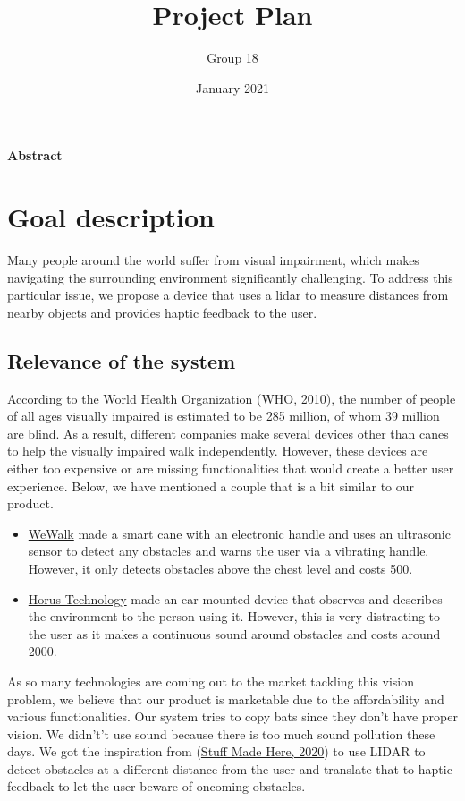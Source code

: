 \documentclass{article}
\title{Project Plan}
\author{Group 18}
\date{January 2021}
\begin{document}
\maketitle

\tableofcontents

\clearpage

\Large{\textbf{Abstract}}
\normalsize
\newline

\section{Goal description}
Many people around the world suffer from visual impairment, which makes navigating the surrounding environment significantly challenging. To address this particular issue, we propose a device that uses a lidar to measure distances from nearby objects and provides haptic feedback to the user.

\subsection{Relevance of the system}
According to the World Health Organization (\href{https://www.who.int/blindness/publications/globaldata/en/#:~:text=Globally\%20the\%20number\%20of\%20people,blindness\%20is\%20cataract\%20(51\%25).}{WHO, 2010}), the number of people of all ages visually impaired is estimated to be 285 million, of whom 39 million are blind. As a result, different companies make several devices other than canes to help the visually impaired walk independently. However, these devices are either too expensive or are missing functionalities that would create a better user experience. Below, we have mentioned a couple that is a bit similar to our product.
\begin{itemize}
\item \href{https://wewalk.io/en/}{WeWalk} made a smart cane with an electronic handle and uses an ultrasonic sensor to detect any obstacles and warns the user via a vibrating handle. However, it only detects obstacles above the chest level and costs 500.


\item \href{https://italianinnovationday.weebly.com/horus-technology.html}{Horus Technology} made an ear-mounted device that observes and describes the environment to the person using it. However, this is very distracting to the user as it makes a continuous sound around obstacles and costs around 2000.
\end{itemize}
As so many technologies are coming out to the market tackling this vision problem, we believe that our product is marketable due to the affordability and various functionalities.
\newline
Our system tries to copy bats since they don’t have proper vision. We didn't’t use sound because there is too much sound pollution these days. We got the inspiration from (\href{https://www.youtube.com/watch?app=desktop&v=8Au47gnXs0w}{Stuff Made Here, 2020}) to use LIDAR to detect obstacles at a different distance from the user and translate that to haptic feedback to let the user beware of oncoming obstacles.
\end{document}
